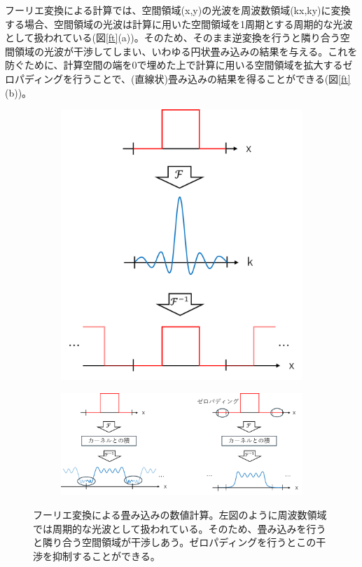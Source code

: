 \documentclass[a4paper,11pt,uplatex]{jsbook}
\begin{document}
フーリエ変換による計算では、空間領域(x,y)の光波を周波数領域(kx,ky)に変換する場合、空間領域の光波は計算に用いた空間領域を1周期とする周期的な光波として扱われている(図\ref{ft}(a))。そのため、そのまま逆変換を行うと隣り合う空間領域の光波が干渉してしまい、いわゆる円状畳み込みの結果を与える。これを防ぐために、計算空間の端を0で埋めた上で計算に用いる空間領域を拡大するゼロパディングを行うことで、(直線状)畳み込みの結果を得ることができる(図\ref{ft}(b))。
\begin{figure}
  \centering
  \begin{subfigure}[h]{0.3\linewidth}
    \centering
    \includegraphics[width=\linewidth]{image/4-ft.png}
  \end{subfigure}
  \hfill
  \begin{subfigure}[h]{0.65\linewidth}
    \centering
    \includegraphics[width=\linewidth]{image/4-ft_zeropadding.png}
  \end{subfigure}
  \caption[フーリエ変換による畳み込みの数値計算]{フーリエ変換による畳み込みの数値計算。左図のように周波数領域では周期的な光波として扱われている。そのため、畳み込みを行うと隣り合う空間領域が干渉しあう。ゼロパディングを行うとこの干渉を抑制することができる。}
\end{figure}
\end{document}
